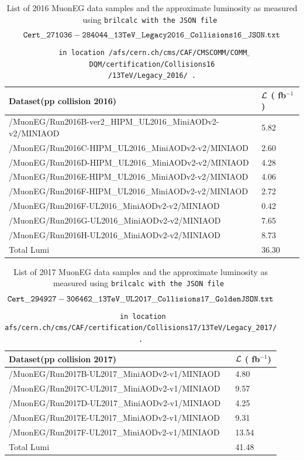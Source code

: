 \documentclass{cernatlasnote}
\newcommand{\fbinv}{\! fb$^{-1}$\xspace}
\begin{document}
\begin{table}[h]\label{tab:datasets2016}
\begin{center}

\begin{tabular}{|l|l|}
\hline     
Dataset(pp collision 2016) & $\cal L$ (\fbinv)  \\\hline
/MuonEG/Run2016B-ver2\_HIPM\_UL2016\_MiniAODv2-v2/MINIAOD     & 5.82  \\
/MuonEG/Run2016C-HIPM\_UL2016\_MiniAODv2-v2/MINIAOD      & 2.60 \\
/MuonEG/Run2016D-HIPM\_UL2016\_MiniAODv2-v2/MINIAOD   & 4.28 \\
/MuonEG/Run2016E-HIPM\_UL2016\_MiniAODv2-v2/MINIAOD     & 4.06 \\
/MuonEG/Run2016F-HIPM\_UL2016\_MiniAODv2-v2/MINIAOD    & 2.72 \\
/MuonEG/Run2016F-UL2016\_MiniAODv2-v2/MINIAOD    & 0.42 \\
/MuonEG/Run2016G-UL2016\_MiniAODv2-v2/MINIAOD     & 7.65 \\
/MuonEG/Run2016H-UL2016\_MiniAODv2-v2/MINIAOD      & 8.73    \\\hline
Total Lumi & 36.30 \\ \hline
\end{tabular}
\end{center}
\caption{List of 2016 MuonEG data samples and the approximate luminosity as measured using \tt brilcalc with the JSON file $${\tt Cert\_271036-284044\_13TeV\_Legacy2016\_Collisions16\_JSON.txt }$$ in location /afs/cern.ch/cms/CAF/CMSCOMM/COMM$\_$DQM/certification/Collisions16 \\/13TeV/Legacy\_2016/ .}\label{tab:datasets2016}
\end{table}
\begin{table}[htbp]\label{tab:datasets2017}
\begin{center}
\begin{tabular}{|l|l|}
\hline
Dataset(pp collision 2017) & $\cal L$ (\fbinv) \\\hline
/MuonEG/Run2017B-UL2017\_MiniAODv2-v1/MINIAOD    & 4.80 \\
 /MuonEG/Run2017C-UL2017\_MiniAODv2-v1/MINIAOD  & 9.57 \\
/MuonEG/Run2017D-UL2017\_MiniAODv2-v1/MINIAOD   & 4.25 \\
 /MuonEG/Run2017E-UL2017\_MiniAODv2-v1/MINIAOD      & 9.31 \\
 /MuonEG/Run2017F-UL2017\_MiniAODv2-v1/MINIAOD      & 13.54 \\ \hline
 Total Lumi & 41.48 \\ \hline
 \end{tabular}
\end{center}
\caption{List of 2017 MuonEG data samples and the approximate luminosity as measured using \tt brilcalc with the JSON file $${\tt Cert\_294927-306462\_13TeV\_UL2017\_Collisions17\_GoldenJSON.txt}$$ in location afs/cern.ch/cms/CAF/certification/Collisions17/13TeV/Legacy\_2017/ .}\label{tab:datasets2017}
\end{table}
\end{document}
